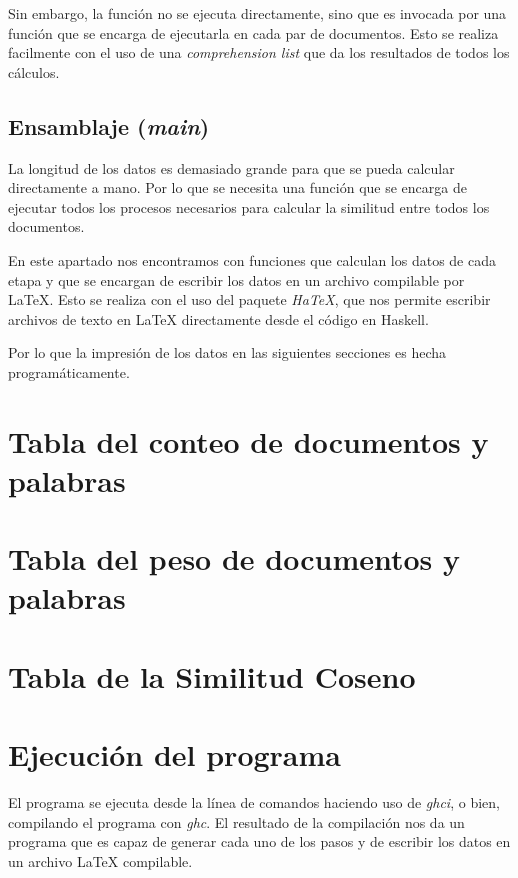 \documentclass{nrfh-ish}
\begin{document}
Sin embargo, la función no se ejecuta directamente, sino que es
invocada por una función que se encarga de ejecutarla en cada
par de documentos. Esto se realiza facilmente con el uso de
una \textit{comprehension list} que da los resultados de todos
los cálculos.

\subsection{Ensamblaje (\textit{main})}
La longitud de los datos es demasiado grande para que se pueda
calcular directamente a mano. Por lo que se necesita una función
que se encarga de ejecutar todos los procesos necesarios para
calcular la similitud entre todos los documentos.

En este apartado nos encontramos con funciones que calculan
los datos de cada etapa y que se encargan de escribir los datos
en un archivo compilable por \LaTeX{}. Esto se realiza con
el uso del paquete \textit{HaTeX}, que nos permite escribir
archivos de texto en \LaTeX{} directamente desde el código
en Haskell.

Por lo que la impresión de los datos en las siguientes secciones
es hecha programáticamente.

\section{Tabla del conteo de documentos y palabras}

{
\fontsize{2pt}{2pt}\selectfont



}

\section{Tabla del peso de documentos y palabras}

{
\fontsize{2pt}{2pt}\selectfont



}

\section{Tabla de la Similitud Coseno}


\resizebox{\textwidth}{!}{
{
\fontsize{2pt}{2pt}\selectfont



}
}

\section{Ejecución del programa}
El programa se ejecuta desde la línea de comandos haciendo
uso de \textit{ghci}, o bien, compilando el programa con
\textit{ghc}. El resultado de la compilación nos da un
programa que es capaz de generar cada uno de los pasos y
de escribir los datos en un archivo \LaTeX{} compilable.
\end{document}
